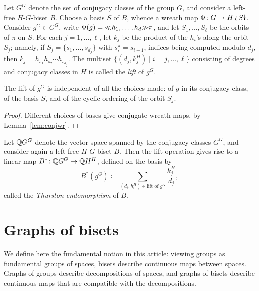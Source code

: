 \documentclass{amsart}
\begin{document}
Let $G^G$ denote the set of conjugacy classes of the group $G$,
and consider a left-free $H$-$G$-biset $B$. Choose a basis $S$ of $B$,
whence a wreath map $\Phi\colon G\to H\wr S{\stackrel{\downarrow}{\smash.}}$.  Consider
$g^G\in G^G$, write $\Phi(g)={\ll}h_1,\dots,h_d{\gg}\pi$, and let
$S_1,\dots,S_\ell$ be the orbits of $\pi$ on $S$.  For each
$j=1,\dots,\ell$, let $k_j$ be the product of the $h_i$'s along the
orbit $S_j$; namely, if $S_j=\{s_1,\dots,s_{d_j}\}$ with
$s_i^\pi=s_{i+1}$, indices being computed modulo $d_j$, then
$k_j=h_{s_1}h_{s_2}\cdots h_{s_{d_j}}$.  The multiset
$\{(d_j,k_j^H)\mid i=j,\dots,\ell\}$ consisting of degrees and
conjugacy classes in $H$ is called the \emph{lift} of $g^G$.
\begin{lem}
  The lift of $g^G$ is independent of all the choices made: of $g$ in
  its conjugacy class, of the basis $S$, and of the cyclic ordering of
  the orbit $S_j$.
\end{lem}
\begin{proof}
  Different choices of bases give conjugate wreath maps, by
  Lemma~\ref{lem:conjwr}.
\end{proof}

Let ${\mathbb Q} G^G$ denote the vector space spanned by the conjugacy classes
$G^G$, and consider again a left-free $H$-$G$-biset $B$. Then the lift
operation gives rise to a linear map
$B^*\colon{\mathbb Q} G^G\to{\mathbb Q} H^H$, defined on the basis by
\begin{equation}\label{eq:conjclasses}
  B^*(g^G)\coloneqq\sum_{(d_i,h_i^H)\in\text{lift of }g^G}\frac{k_j^H}{d_j},
\end{equation}
called the \emph{Thurston endomorphism} of $B$.

\section{Graphs of bisets}
We define here the fundamental notion in this article: viewing groups as
fundamental groups of spaces, bisets describe continuous maps between
spaces. Graphs of groups describe decompositions of spaces, and graphs of
bisets describe continuous maps that are compatible with the
decompositions.
\end{document}
